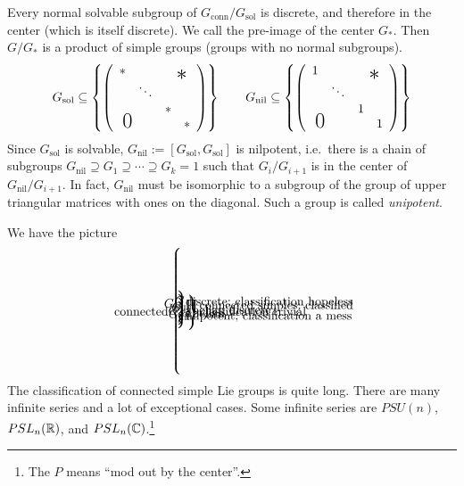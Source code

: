  Every normal solvable subgroup of $G_\text{conn}/G_\text{sol}$ is discrete, and
 therefore in the center (which is itself discrete). We call the pre-image of the
 center $G_*$. Then $G/G_*$ is a product of simple groups (groups with no normal
 subgroups).
 \[
    G_\text{sol}\subseteq
     \left\{ \mat{\ast & & & \smash{\raisebox{-1ex}{\llap{\LARGE $\ast$}}} \\
                   & \ddots &  & \\
                   & & \ast & \\
                 \smash{\rlap{\LARGE 0}} & & & \ast} \right\}
    \qquad
    G_\text{nil}\subseteq
     \left\{ \mat{1 & & & \smash{\raisebox{-1ex}{\llap{\LARGE $\ast$}}} \\
                   & \ddots &  & \\
                   & & 1 & \\
                 \smash{\rlap{\LARGE 0}} & & & 1} \right\}
 \]
 Since $G_\text{sol}$ is solvable, $G_\text{nil}:=[G_\text{sol},G_\text{sol}]$ is
 nilpotent, i.e.\ there is a chain of subgroups
 $G_\text{nil}\supseteq G_1\supseteq\cdots \supseteq G_k=1$ such that $G_i/G_{i+1}$ is
 in the center of $G_\text{nil}/G_{i+1}$. In fact, $G_\text{nil}$ must be isomorphic
 to a subgroup of the group of upper triangular matrices with ones on the diagonal.
 Such a group is called \emph{unipotent}.

 We have the picture
 \[ \vfuzz=5pt
 \begin{xy}
   (0,5) *+{G};
   (0,4) *+{G_\text{conn}} **@{-};
   (0,3) *+{G_{*}} **@{-};
   (0,2) *+{G_\text{sol}} **@{-};
   (0,1) *+{G_\text{nil}} **@{-};
   (0,0) *+{1} **@{-};
   (.7,4.5) *=<0em,1.75em>\frm{)} *+!L{\text{discrete; classification hopeless}};
   (.7,3.5) *=<0em,1.75em>\frm{)} *+!L{\prod \text{connected simples; classified}};
   (.7,2.5) *=<0em,1.75em>\frm{)} *+!L{\text{abelian discrete}};
   (.7,1.5) *=<0em,1.75em>\frm{)} *+!L{\text{abelian}};
        (3.7,2) *=<0em,2.5em>\frm{\}} *++!L{\text{classification trivial}};
   (.7,0.5) *=<0em,1.75em>\frm{)} *+!L{\text{nilpotent; classification a mess}};
   (-1,2) *=<0em,10em>\frm{\{} *++!R{\text{connected}}
 \end{xy}
 \]
 The classification of connected simple Lie groups is quite long.
 There are many infinite series and a lot of exceptional cases. Some infinite series
 are $PSU(n)$, $PSL_n(\mathbb{R})$, and $PSL_n(\mathbb{C})$.\footnote{The $P$ means ``mod out by the
 center''.}

